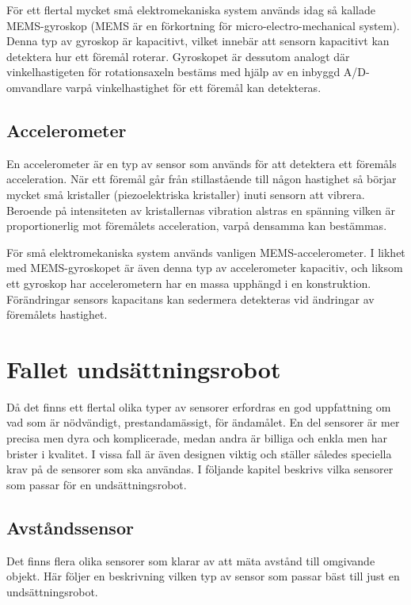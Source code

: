 \documentclass[11pt]{article}
\begin{document}
\begin{flushleft}
För ett flertal mycket små elektromekaniska system används idag så kallade MEMS-gyroskop (MEMS är en förkortning för micro-electro-mechanical system). Denna typ av gyroskop är kapacitivt, vilket innebär att sensorn kapacitivt kan detektera hur ett föremål roterar. Gyroskopet är dessutom analogt där vinkelhastigeten för rotationsaxeln bestäms med hjälp av en inbyggd A/D-omvandlare varpå vinkelhastighet för ett föremål kan detekteras. \cite{MEMS_gyro}

\subsection{Accelerometer}
En accelerometer är en typ av sensor som används för att detektera ett föremåls acceleration. När ett föremål går från stillastående till någon hastighet så börjar mycket små kristaller (piezoelektriska kristaller) inuti sensorn att vibrera. Beroende på intensiteten av kristallernas vibration alstras en spänning vilken är proportionerlig mot föremålets acceleration, varpå densamma kan bestämmas. \cite{Accelerometer}

För små elektromekaniska system används vanligen MEMS-accelerometer. I likhet med MEMS-gyroskopet är även denna typ av accelerometer kapacitiv, och liksom ett gyroskop har accelerometern har en massa upphängd i en konstruktion. Förändringar sensors kapacitans kan sedermera detekteras vid ändringar av föremålets hastighet. \cite{MEMS_acc}





\pagebreak
\section{Fallet undsättningsrobot}
Då det finns ett flertal olika typer av sensorer erfordras en god uppfattning om vad som är nödvändigt, prestandamässigt, för ändamålet. En del sensorer är mer precisa men dyra och komplicerade, medan andra är billiga och enkla men har brister i kvalitet. I vissa fall är även designen viktig och ställer således speciella krav på de sensorer som ska användas. I följande kapitel beskrivs vilka sensorer som passar för en undsättningsrobot. 

\subsection{Avståndssensor}
Det finns flera olika sensorer som klarar av att mäta avstånd till omgivande objekt. Här följer en beskrivning vilken typ av sensor som passar bäst till just en undsättningsrobot. 


\end{flushleft}
\end{document}

